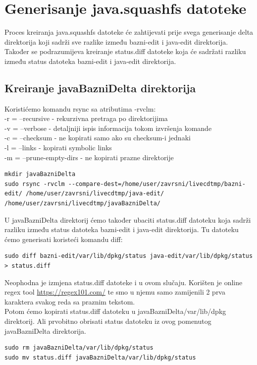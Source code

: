 \documentclass[12pt,vi]{mitthesis}
\begin{document}
\section*{Generisanje java.squashfs datoteke}
\indent
Proces kreiranja java.squashfs datoteke će zahtijevati prije svega generisanje delta direktorija koji sadrži sve razlike između bazni-edit i java-edit direktorija. Također se podrazumijeva kreiranje status.diff datoteke koja će sadržati razliku između status datoteka bazni-edit i java-edit direktorija.\\

\subsection*{Kreiranje javaBazniDelta direktorija}
\indent
Koristićemo komandu rsync sa atributima -rvclm:\\
-r = --recursive - rekurzivna pretraga po direktorijima\\
-v = --verbose - detaljniji ispis informacija tokom izvršenja komande\\
-c = --checksum - ne kopirati samo ako su checksum-i jednaki\\
-l = --links - kopirati symbolic links\\
-m = --prune-empty-dirs - ne kopirati prazne direktorije\\
\begin{lstlisting}[style=BashInputStyle]
mkdir javaBazniDelta
sudo rsync -rvclm --compare-dest=/home/user/zavrsni/livecdtmp/bazni-edit/ /home/user/zavrsni/livecdtmp/java-edit/ /home/user/zavrsni/livecdtmp/javaBazniDelta/
\end{lstlisting}
\indent
U javaBazniDelta direktorij ćemo također ubaciti status.diff datoteku koja sadrži razliku između status datoteka bazni-edit i java-edit direktorija. Tu datoteku ćemo generisati koristeći komandu diff:
\begin{lstlisting}[style=BashInputStyle]
sudo diff bazni-edit/var/lib/dpkg/status java-edit/var/lib/dpkg/status > status.diff
\end{lstlisting}
Neophodna je izmjena status.diff datoteke i u ovom slučaju.
Korišten je online regex tool \url{https://regex101.com/} te smo u njemu samo zamijenili 2 prva karaktera svakog reda sa praznim tekstom.\\
\indent
Potom ćemo kopirati status.diff datoteku u javaBazniDelta/var/lib/dpkg direktorij. Ali prvobitno obrisati status datoteku iz ovog pomenutog javaBazniDelta direktorija.\\
\begin{lstlisting}[style=BashInputStyle]
sudo rm javaBazniDelta/var/lib/dpkg/status
sudo mv status.diff javaBazniDelta/var/lib/dpkg/status
\end{lstlisting}
\end{document}
